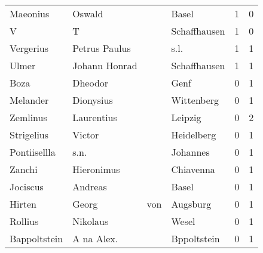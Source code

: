 \begin{center}
\begin{tiny}
\begin{longtabu}{llllrr}
                 Maeonius &                             Oswald &             &                                       Basel &          1 &         0 \\
                        V &                                  T &             &                                Schaffhausen &          1 &         0 \\
                Vergerius &                      Petrus Paulus &             &                                        s.l. &          1 &         1 \\
                    Ulmer &                      Johann Honrad &             &                                Schaffhausen &          1 &         1 \\
                     Boza &                            Dheodor &             &                                        Genf &          0 &         1 \\
                 Melander &                          Dionysius &             &                                  Wittenberg &          0 &         1 \\
                 Zemlinus &                         Laurentius &             &                                     Leipzig &          0 &         2 \\
               Strigelius &                             Victor &             &                                  Heidelberg &          0 &         1 \\
             Pontiisellla &                               s.n. &             &                                    Johannes &          0 &         1 \\
                   Zanchi &                         Hieronimus &             &                                   Chiavenna &          0 &         1 \\
                 Jociscus &                            Andreas &             &                                       Basel &          0 &         1 \\
                   Hirten &                              Georg &         von &                                    Augsburg &          0 &         1 \\
                  Rollius &                           Nikolaus &             &                                       Wesel &          0 &         1 \\
             Bappoltstein &                         A na Alex. &             &                                 Bppoltstein &          0 &         1 \\

\end{longtabu}
\end{tiny}
\end{center}
